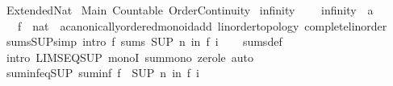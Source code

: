 %
\begin{isabellebody}%
%
%
\isadelimdocument
%
\endisadelimdocument
%
\isatagdocument
%
\isamarkuptrue%
%
\endisatagdocument
{\isafolddocument}%
%
\isadelimdocument
%
\endisadelimdocument
%
\isadelimtheory
%
\endisadelimtheory
%
\isatagtheory
{}\isamarkupfalse%
\ Extended{\isacharunderscore}Nat\isanewline
{}\ Main\ Countable\ Order{\isacharunderscore}Continuity\isanewline
{}%
\endisatagtheory
{\isafoldtheory}%
%
\isadelimtheory
\isanewline
%
\endisadelimtheory
\isanewline
{}\isamarkupfalse%
\ infinity\ {\isacharequal}\isanewline
\ \ \ infinity\ {\isacharcolon}{\isacharcolon}\ {\isachardoublequoteopen}{\isacharprime}a{\isachardoublequoteclose}\ \ {\isacharparenleft}{\isachardoublequoteopen}{\isasyminfinity}{\isachardoublequoteclose}{\isacharparenright}\isanewline
\isanewline
{}\isamarkupfalse%
\isanewline
\ \ \ f\ {\isacharcolon}{\isacharcolon}\ {\isachardoublequoteopen}nat\ {\isasymRightarrow}\ {\isacharprime}a{\isacharcolon}{\isacharcolon}{\isacharbraceleft}canonically{\isacharunderscore}ordered{\isacharunderscore}monoid{\isacharunderscore}add{\isacharcomma}\ linorder{\isacharunderscore}topology{\isacharcomma}\ complete{\isacharunderscore}linorder{\isacharbraceright}{\isachardoublequoteclose}\isanewline
{}\isanewline
\isanewline
{}\isamarkupfalse%
\ sums{\isacharunderscore}SUP{\isacharbrackleft}simp{\isacharcomma}\ intro{\isacharbrackright}{\isacharcolon}\ {\isachardoublequoteopen}f\ sums\ {\isacharparenleft}SUP\ n{\isachardot}\ {\isasymSum}i{\isacharless}n{\isachardot}\ f\ i{\isacharparenright}{\isachardoublequoteclose}\isanewline
%
\isadelimproof
\ \ %
\endisadelimproof
%
\isatagproof
{}\isamarkupfalse%
\ sums{\isacharunderscore}def\ \isamarkupfalse%
\ {\isacharparenleft}intro\ LIMSEQ{\isacharunderscore}SUP\ monoI\ sum{\isacharunderscore}mono{}\ zero{\isacharunderscore}le{\isacharparenright}\ auto%
\endisatagproof
{\isafoldproof}%
%
\isadelimproof
\isanewline
%
\endisadelimproof
\isanewline
{}\isamarkupfalse%
\ suminf{\isacharunderscore}eq{\isacharunderscore}SUP{\isacharcolon}\ {\isachardoublequoteopen}suminf\ f\ {\isacharequal}\ {\isacharparenleft}SUP\ n{\isachardot}\ {\isasymSum}i{\isacharless}n{\isachardot}\ f\ i{\isacharparenright}{\isachardoublequoteclose}\isanewline
%
\isadelimproof

\end{isabellebody}
